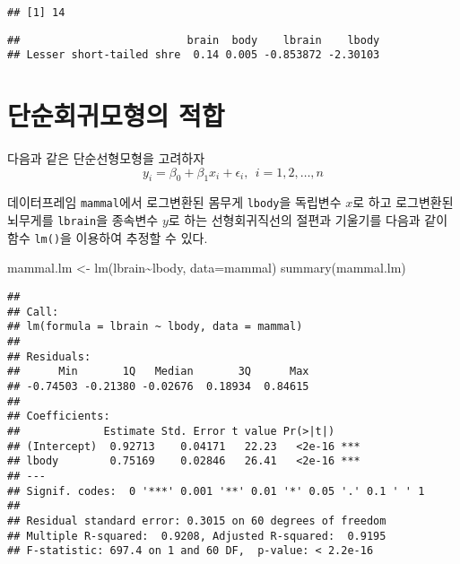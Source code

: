 \documentclass[
]{book}
\newenvironment{Shaded}{\begin{snugshade}}{\end{snugshade}}
\newcommand{\AttributeTok}[1]{\textcolor[rgb]{0.77,0.63,0.00}{#1}}
\newcommand{\FunctionTok}[1]{\textcolor[rgb]{0.00,0.00,0.00}{#1}}
\newcommand{\NormalTok}[1]{#1}
\newcommand{\OtherTok}[1]{\textcolor[rgb]{0.56,0.35,0.01}{#1}}
\newcommand{\SpecialCharTok}[1]{\textcolor[rgb]{0.00,0.00,0.00}{#1}}
\begin{document}
\begin{verbatim}
## [1] 14
\end{verbatim}

\begin{Shaded}
\end{Shaded}

\begin{verbatim}
##                          brain  body    lbrain    lbody
## Lesser short-tailed shre  0.14 0.005 -0.853872 -2.30103
\end{verbatim}

\hypertarget{uxb2e8uxc21cuxd68cuxadc0uxbaa8uxd615uxc758-uxc801uxd569}{%
\section{단순회귀모형의 적합}\label{uxb2e8uxc21cuxd68cuxadc0uxbaa8uxd615uxc758-uxc801uxd569}}

다음과 같은 단순선형모형을 고려하자
\[ y_i = \beta_0 + \beta_1  x_i + \epsilon_i,~~ i=1,2,\dots,n \]

데이터프레임 \texttt{mammal}에서 로그변환된 몸무게 \texttt{lbody}을 독립변수 \(x\)로 하고 로그변환된 뇌무게를 \texttt{lbrain}을 종속변수 \(y\)로 하는 선형회귀직선의 절편과 기울기를 다음과 같이 함수 \texttt{lm()}을 이용하여 추정할 수 있다.

\begin{Shaded}
\begin{Highlighting}[]
\NormalTok{mammal.lm }\OtherTok{\textless{}{-}} \FunctionTok{lm}\NormalTok{(lbrain}\SpecialCharTok{\textasciitilde{}}\NormalTok{lbody, }\AttributeTok{data=}\NormalTok{mammal)}
\FunctionTok{summary}\NormalTok{(mammal.lm)}
\end{Highlighting}
\end{Shaded}

\begin{verbatim}
## 
## Call:
## lm(formula = lbrain ~ lbody, data = mammal)
## 
## Residuals:
##      Min       1Q   Median       3Q      Max 
## -0.74503 -0.21380 -0.02676  0.18934  0.84615 
## 
## Coefficients:
##             Estimate Std. Error t value Pr(>|t|)    
## (Intercept)  0.92713    0.04171   22.23   <2e-16 ***
## lbody        0.75169    0.02846   26.41   <2e-16 ***
## ---
## Signif. codes:  0 '***' 0.001 '**' 0.01 '*' 0.05 '.' 0.1 ' ' 1
## 
## Residual standard error: 0.3015 on 60 degrees of freedom
## Multiple R-squared:  0.9208, Adjusted R-squared:  0.9195 
## F-statistic: 697.4 on 1 and 60 DF,  p-value: < 2.2e-16
\end{verbatim}
\end{document}
